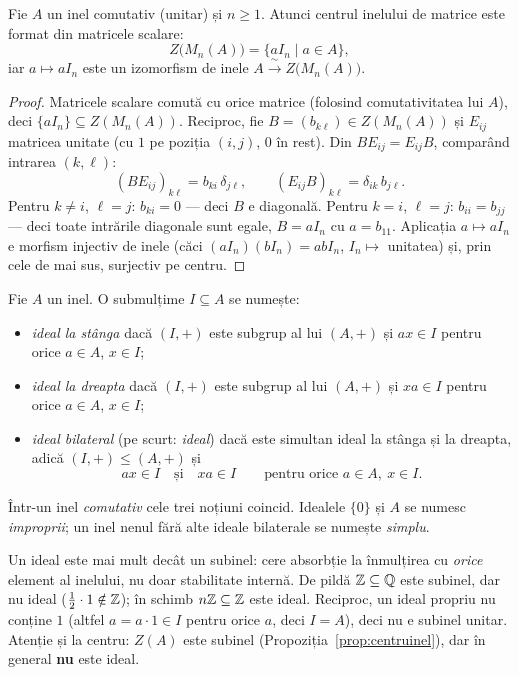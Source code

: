 \begin{propozitie}\label{prop:centrumatrice}
Fie $A$ un inel comutativ (unitar) și $n\ge1$. Atunci centrul inelului de matrice este format din matricele scalare:
\[
Z\big(M_n(A)\big)=\{a I_n\mid a\in A\},
\]
iar $a\mapsto aI_n$ este un izomorfism de inele $A\xrightarrow{\ \sim\ }Z\big(M_n(A)\big)$.
\end{propozitie}
\begin{proof}
Matricele scalare comută cu orice matrice (folosind comutativitatea lui $A$), deci $\{aI_n\}\subseteq Z(M_n(A))$. Reciproc, fie $B=(b_{k\ell})\in Z(M_n(A))$ și $E_{ij}$ matricea unitate (cu $1$ pe poziția $(i,j)$, $0$ în rest). Din $BE_{ij}=E_{ij}B$, comparând intrarea $(k,\ell)$:
\[
(BE_{ij})_{k\ell}=b_{ki}\,\delta_{j\ell},\qquad (E_{ij}B)_{k\ell}=\delta_{ik}\,b_{j\ell}.
\]
Pentru $k\neq i$, $\ell=j$: $b_{ki}=0$ --- deci $B$ e diagonală. Pentru $k=i$, $\ell=j$: $b_{ii}=b_{jj}$ --- deci toate intrările diagonale sunt egale, $B=aI_n$ cu $a=b_{11}$. Aplicația $a\mapsto aI_n$ e morfism injectiv de inele (căci $(aI_n)(bI_n)=abI_n$, $I_n\mapsto$ unitatea) și, prin cele de mai sus, surjectiv pe centru.
\end{proof}

\begin{definitie}\label{def:ideal}
Fie $A$ un inel. O submulțime $I\subseteq A$ se numește:
\begin{itemize}[nosep,leftmargin=1.4em]
\item \emph{ideal la stânga} dacă $(I,+)$ este subgrup al lui $(A,+)$ și $a x\in I$ pentru orice $a\in A$, $x\in I$;
\item \emph{ideal la dreapta} dacă $(I,+)$ este subgrup al lui $(A,+)$ și $x a\in I$ pentru orice $a\in A$, $x\in I$;
\item \emph{ideal bilateral} (pe scurt: \emph{ideal}) dacă este simultan ideal la stânga și la dreapta, adică $(I,+)\le (A,+)$ și
\[
a x\in I \quad\text{și}\quad x a\in I \qquad \text{pentru orice } a\in A,\ x\in I .
\]
\end{itemize}
Într-un inel \emph{comutativ} cele trei noțiuni coincid. Idealele $\{0\}$ și $A$ se numesc \emph{improprii}; un inel nenul fără alte ideale bilaterale se numește \emph{simplu}.
\end{definitie}

\begin{observatie}
Un ideal este mai mult decât un subinel: cere absorbție la înmulțirea cu \emph{orice} element al inelului, nu doar stabilitate internă. De pildă $\mathbb{Z}\subseteq\mathbb{Q}$ este subinel, dar nu ideal ($\frac12\cdot 1\notin\mathbb{Z}$); în schimb $n\mathbb{Z}\subseteq\mathbb{Z}$ este ideal. Reciproc, un ideal propriu nu conține $1$ (altfel $a=a\cdot 1\in I$ pentru orice $a$, deci $I=A$), deci nu e subinel unitar. Atenție și la centru: $Z(A)$ este subinel (Propoziția~\ref{prop:centruinel}), dar în general \textbf{nu} este ideal.
\end{observatie}

